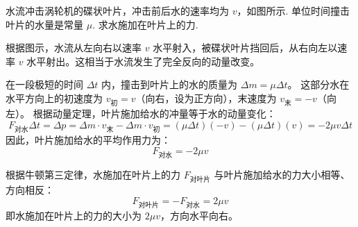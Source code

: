 \begin{exercise}\label{ex:3.10}
水流冲击涡轮机的碟状叶片，冲击前后水的速率均为 $v$，如图所示. 单位时间撞击叶片的水量是常量 $\mu$. 求水施加在叶片上的力.
\begin{center}
\end{center}
\end{exercise}
\begin{solution}
根据图示，水流从左向右以速率 $v$ 水平射入，被碟状叶片挡回后，从右向左以速率 $v$ 水平射出。这相当于水流发生了完全反向的动量改变。

在一段极短的时间 $\Delta t$ 内，撞击到叶片上的水的质量为 $\Delta m = \mu \Delta t$。
这部分水在水平方向上的初速度为 $v_{\text{初}} = v$（向右，设为正方向），末速度为 $v_{\text{末}} = -v$（向左）。
根据动量定理，叶片施加给水的冲量等于水的动量变化：
$$ F_{\text{对水}} \Delta t = \Delta p = \Delta m \cdot v_{\text{末}} - \Delta m \cdot v_{\text{初}} = (\mu \Delta t)(-v) - (\mu \Delta t)(v) = -2\mu v \Delta t $$
因此，叶片施加给水的平均作用力为：
$$ F_{\text{对水}} = -2\mu v $$

根据牛顿第三定律，水施加在叶片上的力 $F_{\text{对叶片}}$ 与叶片施加给水的力大小相等、方向相反：
$$ F_{\text{对叶片}} = - F_{\text{对水}} = 2\mu v $$
即水施加在叶片上的力的大小为 $2\mu v$，方向水平向右。
\end{solution}

